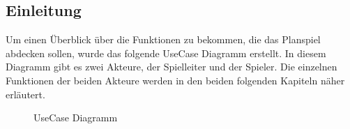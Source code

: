 \subsection{Einleitung}
\label{sec:fachkonzept-usecase-einleitung}

Um einen Überblick über die Funktionen zu bekommen, die das Planspiel abdecken sollen, wurde das folgende UseCase Diagramm erstellt. In diesem Diagramm gibt es zwei Akteure, der Spielleiter und der Spieler. Die einzelnen Funktionen der beiden Akteure werden in den beiden folgenden Kapiteln näher erläutert.

\begin{figure}[h]
  \centering
  \caption{UseCase Diagramm}
  \label{img:fachkonzept-usecase}
\end{figure}

\autorende{}